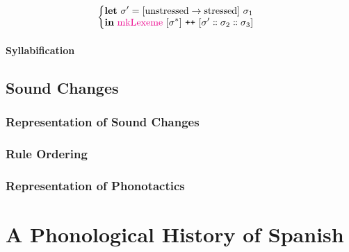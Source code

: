 \documentclass{report}[12pt]
\begin{document}
\begin{align*}
\begin{cases}
\begin{aligned}
                                                                                     & \textbf{let}\ \sigma' = [\text{unstressed} \rightarrow \text{stressed}]\ \sigma_1 \\
                                                                                     & \textbf{in}\ \text{\textcolor{magenta}{mkLexeme}}\ [\sigma^{*}]\ \texttt{++}\ [\sigma' \dblcolon \sigma_2 \dblcolon \sigma_3] \\
                                                                                   \end{aligned} \\
                                                      \end{cases}
\end{align*}

\subsection{Syllabification}

\chapter{Sound Changes}


\section{Representation of Sound Changes}

\section{Rule Ordering}

\section{Representation of Phonotactics}

\part*{A Phonological History of Spanish}
\end{document}
